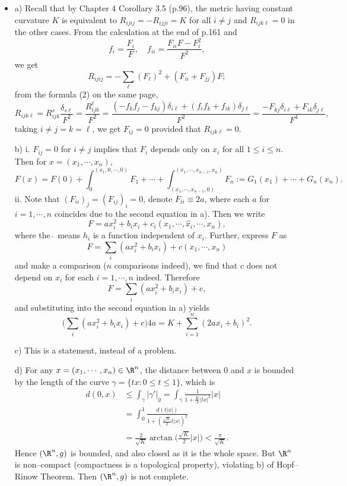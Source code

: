 \begin{itemize}
    \item[1.] a) Recall that by Chapter 4 Corollary 3.5 (p.96), 
    the metric having constant curvature $K$ is equivalent to
    $R_{ijij}=-R_{ijji}=K$ for all $i\ne j$ 
    and $R_{ijk\ell}=0$ in the other cases. From the calculation 
    at the end of p.161 and
    \[f_i=\frac{F_i}{F},\quad f_{ii}=\frac{F_{ii}F-F_i^2}{F^2},\]
    we get
    \[R_{ijij}=-\sum_\ell (F_\ell)^2+(F_{ii}+F_{jj})F;\]
    from the formula (2) on the same page,
    \[R_{ijk\ell}=R_{ijk}^s\frac{\delta_{s\ell}}{F^2}
    =\frac{R_{ijk}^\ell}{F^2}
    =\frac{(-f_kf_j-f_{kj})\delta_{i\ell}+(f_if_k+f_{ik})\delta_{j\ell}}{F^2}
    =\frac{-F_{kj}\delta_{i\ell}+F_{ik}\delta_{j\ell}}{F^4},\]
    taking $i\ne j=k=\ell$, we get $F_{ij}=0$ provided that $R_{ijk\ell}=0$.

    b) i. $F_{ij}=0$ for $i\ne j$ implies that $F_i$ depends only on $x_i$ 
    for all $1\le i\le n$. Then for $x=(x_1,\cdots,x_n)$,
    \[F(x)=F(0)+\int_0^{(x_1,0,\cdots,0)}F_1+\cdots
    +\int_{(x_1,\cdots,x_{n-1},0)}^{(x_1,\cdots,x_{n-1},x_n)}F_n
    :=G_1(x_1)+\cdots+G_n(x_n).\]
    ii. Note that $(F_{ii})_j=(F_{ij})_i=0$, denote $F_{ii}\equiv2a$, 
    where each $a$ for $i=1,\cdots,n$ coincides 
    due to the second equation in a). Then we write
    \[F=ax_i^2+b_ix_i+c_i(x_1,\cdots,\hat{x}_i,\cdots,x_n),\]
    where the $\hat{\ }$ means $h_i$ is a function independent of $x_i$. 
    Further, express $F$ as
    \[F=\sum_i(ax_i^2+b_ix_i)+c(x_1,\cdots,x_n)\]
    and make a comparison ($n$ comparisons indeed), we find that 
    $c$ does not depend on $x_i$ for each $i=1,\cdots,n$ indeed. Therefore
    \[F=\sum_i(ax_i^2+b_ix_i)+c,\]
    and substituting into the second equation in a) yields
    \[\Big(\sum_i(ax_i^2+b_ix_i)+c\Big)4a=K+\sum_{i=1}^n(2ax_i+b_i)^2.\]

    c) This is a statement, instead of a problem.

    d) For any $x=(x_1,\cdots,x_n)\in\R^n$, the distance between $0$ and $x$ 
    is bounded by the length of the curve $\gamma=\{tx:0\le t\le 1\}$, 
    which is
    \begin{align*}
        d(0,x)&\le\int_\gamma|\gamma'|_g
        =\int_\gamma\frac{1}{1+\frac{K}{4}|tx|^2}|x|\\
        &=\int_0^1\frac{d(t|x|)}{1+\left(\frac{\sqrt{K}}{2}t|x|\right)^2}\\
        &=\frac{2}{\sqrt{K}}\arctan\Big(\frac{\sqrt{K}}{2}|x|\Big)
        <\frac{\pi}{\sqrt{K}}.
    \end{align*}
    Hence $(\R^n,g)$ is bounded, and also closed as it is the whole space. 
    But $\R^n$ is non--compact (compactness is a topological property), 
    violating b) of Hopf--Rinow Theorem. Then $(\R^n,g)$ is not complete.


\end{itemize}
